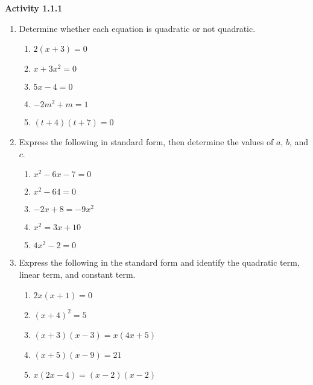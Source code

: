\vspace{1ex}
\noindent\textbf{Activity 1.1.1}

\vspace{0.75ex}
 
\begin{enumerate}[label = \color{blue} \Alph*. ]
   \item Determine whether each equation is quadratic or not quadratic.
\begin{multicols}{3}
\begin{enumerate}[label = \color{blue}\arabic*. ] 
   \item $ 2(x + 3) = 0 $
   \item $ x + 3x^2 = 0 $
   \item $ 5x - 4 = 0 $
   \item $ -2m^2 + m = 1 $
   \item $ (t + 4)(t+7) = 0 $
\end{enumerate}
\end{multicols}
				 
   \item Express the following in standard form, then determine the values of $a$, $b$, and $c$.
\begin{multicols}{3}
\begin{enumerate}[label = \color{blue} \arabic*. ]
   \item $ x^2 - 6x - 7 = 0 $

   \item $ x^2 - 64 = 0 $
   \item $ -2x +8 = -9x^2 $
   \item $ x^2 = 3x + 10 $
   \item $ 4x^2 - 2 = 0 $
\end{enumerate}
\end{multicols}
		 
   \item Express the following in the standard form and identify the quadratic term, linear term, and constant term.
\begin{multicols}{2}
\begin{enumerate}[label = \color{blue}\arabic*. ]
   \item $ 2x(x + 1) = 0 $

   \item $ (x + 4)^2 = 5 $
   \item $ (x + 3)(x - 3) = x(4x + 5) $
   \item $ (x + 5)(x - 9) = 21 $
   \item $ x(2x - 4) = (x - 2)(x - 2) $ 
\end{enumerate}
\end{multicols}
	 
\end{enumerate}
				
				
